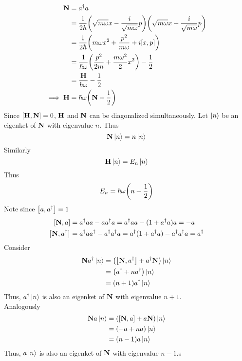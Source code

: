 \documentclass[12pt,a4paper,titlepage]{article}
\begin{document}
\begin{equation}
\begin{aligned}
\vb{N}&=a^{\dagger}a\\
&=\frac{1}{2\hbar}\qty(\sqrt{m\omega}x-\frac{i}{\sqrt{m\omega}}p)\qty(\sqrt{m\omega}x+\frac{i}{\sqrt{m\omega}}p)\\
&=\frac{1}{2\hbar}\qty(m\omega x^{2}+\frac{p^{2}}{m\omega}+i\comm{x}{p})\\
&=\frac{1}{\hbar\omega}\qty(\frac{p^{2}}{2m}+\frac{m\omega^{2}}{2}x^{2})-\frac{1}{2}\\
&=\frac{\vb{H}}{\hbar\omega}-\frac{1}{2}\\
\implies \vb{H}&=\hbar\omega\qty(\vb{N}+\frac{1}{2})
\end{aligned}
\end{equation}
Since $\comm{\vb{H}}{\vb{N}}=0$, $\vb{H}$ and $\vb{N}$ can be diagonalized simultaneously. Let $\ket{n}$ be an eigenket of $\vb{N}$ with eigenvalue $n$. Thus
\begin{equation}
\vb{N}\ket{n}=n\ket{n}
\end{equation}
Similarly
\begin{equation}
\vb{H}\ket{n}=E_{n}\ket{n}
\end{equation}
Thus
\begin{equation}
E_{n}=\hbar\omega\qty(n+\frac{1}{2})
\end{equation}
Note since $\comm{a}{a^{\dagger}}=1$
\begin{align}
\comm{\vb{N}}{a}&=a^{\dagger}aa-aa^{\dagger}a=a^{\dagger}aa-(1+a^{\dagger}a)a=-a\\
\comm{\vb{N}}{a^{\dagger}}&=a^{\dagger}aa^{\dagger}-a^{\dagger}a^{\dagger}a=a^{\dagger}(1+a^{\dagger}a)-a^{\dagger}a^{\dagger}a=a^{\dagger}
\end{align}
Consider
\begin{equation}
\begin{aligned}
\vb{N}a^{\dagger}\ket{n}&=\qty(\comm{\vb{N}}{a^{\dagger}}+a^{\dagger}\vb{N})\ket{n}\\
&=\qty(a^{\dagger}+na^{\dagger})\ket{n}\\
&=(n+1)a^{\dagger}\ket{n}
\end{aligned}
\end{equation}
Thus, $a^{\dagger}\ket{n}$ is also an eigenket of $\vb{N}$ with eigenvalue $n+1$.\\

Analogously
\begin{equation}
\begin{aligned}
\vb{N}a\ket{n}&=(\comm{\vb{N}}{a}+a\vb{N})\ket{n}\\
&=(-a+na)\ket{n}\\
&=(n-1)a\ket{n}
\end{aligned}
\end{equation}
Thus, $a\ket{n}$ is also an eigenket of $\vb{N}$ with eigenvalue $n-1$.s
\end{document}
